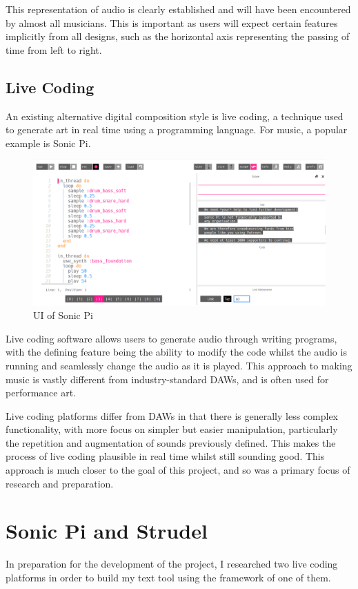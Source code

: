 \documentclass[12pt,a4paper,twoside,openright]{report}
\begin{document}
This representation of audio is clearly established and will have been encountered by almost all musicians. This is important as users will expect certain features implicitly from all designs, such as the horizontal axis representing the passing of time from left to right.

\subsection{Live Coding}
An existing alternative digital composition style is live coding, a technique used to generate art in real time using a programming language. For music, a popular example is Sonic Pi.

\begin{figure}[h]
    \centering
    \includegraphics[scale=0.4]{images/sonicpi.png}
    \caption{UI of Sonic Pi}
    \label{fig:sonic_pi}
\end{figure}

Live coding software allows users to generate audio through writing programs, with the defining feature being the ability to modify the code whilst the audio is running and seamlessly change the audio as it is played. This approach to making music is vastly different from industry-standard DAWs, and is often used for performance art.

Live coding platforms differ from DAWs in that there is generally less complex functionality, with more focus on simpler but easier manipulation, particularly the repetition and augmentation of sounds previously defined. This makes the process of live coding plausible in real time whilst still sounding good. This approach is much closer to the goal of this project, and so was a primary focus of research and preparation.

\section{Sonic Pi and Strudel}
In preparation for the development of the project, I researched two live coding platforms in order to build my text tool using the framework of one of them.
\end{document}
